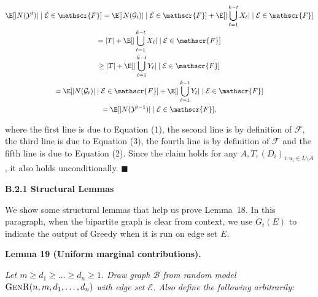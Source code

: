\documentclass[10pt,a4paper]{article}
\begin{document}
\[\begin{gathered}
\displaystyle\E[|N(\mathcal{Y}^{t})|\mid\mathcal{E}\in\mathscr{F}] \displaystyle=\E[|N(\mathcal{G}_{t})|\mid\mathcal{E}\in\mathscr{F}]+\E[|\bigcup_{\ell=1}^{k-t}{X_{\ell}}|\mid\mathcal{E}\in\mathscr{F}] \\
\displaystyle=|T|+\E[|\bigcup_{\ell=1}^{k-t}{X_{\ell}}|\mid\mathcal{E}\in\mathscr{F}] \\
\displaystyle\geq|T|+\E[|\bigcup_{\ell=1}^{k-t}{Y_{\ell}}|\mid\mathcal{E}\in\mathscr{F}] \\
\displaystyle=\E[|N(\mathcal{G}_{t})|\mid\mathcal{E}\in\mathscr{F}]+\E[|\bigcup_{\ell=1}^{k-t}{Y_{\ell}}|\mid\mathcal{E}\in\mathscr{F}] \\
\displaystyle=\E[|N(\mathcal{Y}^{t-1})|\mid\mathcal{E}\in\mathscr{F}],
\end{gathered}\]


where the first line is due to Equation (1), the second line is by definition of $\mathscr{F}$, the third line is due to Equation (3), the fourth line is by definition of $\mathscr{F}$ and the fifth line is due to Equation (2).
Since the claim holds for any $A,T,(D_{i})_{i:u_{i}\in L\setminus A}$, it also holds unconditionally.
\ensuremath{\blacksquare}\par





\par\medskip\noindent\textbf{B.2.1 Structural Lemmas}\par




We show some structural lemmas that help us prove Lemma 18. In this paragraph, when the bipartite graph is clear from context, we use $G_{t}(E)$ to indicate the output of Greedy when it is run on edge set $E$.\par





\par\medskip\noindent\textbf{\textbf{Lemma 19}\textbf{ }(Uniform marginal contributions)\textbf{.}}\par



\emph{Let $m\geq d_{1}\geq\dots\geq d_{n}\geq 1$. Draw graph $\mathcal{B}$ from random model $\textsc{GenR}(n,m,d_{1},\dots,d_{n})$ with edge set $\mathcal{E}$.
Also define the following arbitrarily:}\par
\end{document}
